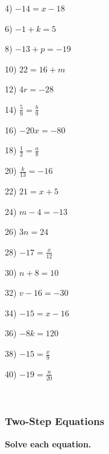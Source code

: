\documentclass[11pt]{book}
\newcommand{\tmstrong}[1]{\textbf{#1}}
\theoremstyle{definition}  %
\begin{document}
\begin{multicols}{2}
  4) $- 14 = x - 18$
  
  6) $- 1 + k = 5$
  
  8) $- 13 + p = - 19$
  
  10) $22 = 16 + m$
  
  12) $4 r = - 28$
  
  14) $\frac{5}{9} = \frac{b}{9}$
  
  16) $- 20 x = - 80$
  
  18) $\frac{1}{2} = \frac{a}{8}$
  
  20) $\frac{k}{13} = - 16$
  
  22) $21 = x + 5$
  
  24) $m - 4 = - 13$
  
  26) $3 n = 24$
  
  28) $- 17 = \frac{x}{12}$
  
  30) $n + 8 = 10$
  
  32) $v - 16 = - 30$
  
  34) $- 15 = x - 16$
  
  36) $- 8 k = 120$
  
  38) $- 15 = \frac{x}{9}$
  
  40) $- 19 = \frac{n}{20}$
\end{multicols}

\vspace{2in}
~

\pagebreak

\subsubsection{Two-Step Equations}\par


{\tmstrong{Solve each equation.}}
\end{document}
